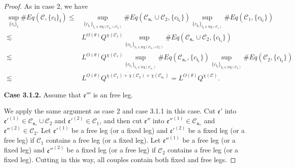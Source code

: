 \begin{proof}
As in case 2, we have
\begin{equation}
\begin{split}
    \sup_{\{c_{\mathfrak{l}}\}_{\mathfrak{l}}}\#Eq(\mathcal{C},\{c_{\mathfrak{l}}\}_{\mathfrak{l}})
    \le&
    \sup_{\{c_{\mathfrak{l}_1}\}_{\mathfrak{l}_1\in \text{leg}(\mathcal{C}_{\mathfrak{n}_*}\cup \mathcal{C}_2)} } \# Eq(\mathcal{C}_{\mathfrak{n}_*}\cup \mathcal{C}_2,\{c_{\mathfrak{l}_1}\}) \sup_{\{c_{\mathfrak{l}_2}\}_{\mathfrak{l}_2\in \text{leg}(\mathcal{C}_1)} }\# Eq(\mathcal{C}_{1}, \{c_{\mathfrak{l}_2}\})
    \\
    \lesssim&  L^{O(\theta)} Q^{\chi(\mathcal{C}_1)}\sup_{\{c_{\mathfrak{l}_1}\}_{\mathfrak{l}_1\in \text{leg}(\mathcal{C}_{\mathfrak{n}_*}\cup \mathcal{C}_2)} } \# Eq(\mathcal{C}_{\mathfrak{n}_*}\cup \mathcal{C}_2,\{c_{\mathfrak{l}_1}\})
    \\
    \lesssim&  L^{O(\theta)} Q^{\chi(\mathcal{C}_1)} \sup_{\{c_{\mathfrak{l}_1}\}_{\mathfrak{l}_1\in \text{leg}(\mathcal{C}_{\mathfrak{n}_*})} } \# Eq(\mathcal{C}_{\mathfrak{n}_*},\{c_{\mathfrak{l}_1}\}) \sup_{\{c_{\mathfrak{l}_2}\}_{\mathfrak{l}_2\in \text{leg}(\mathcal{C}_2)} }\# Eq(\mathcal{C}_{2}, \{c_{\mathfrak{l}_2}\})
    \\
    \lesssim&  L^{O(\theta)} Q^{\chi(\mathcal{C}_1)+\chi(\mathcal{C}_2)+\chi(\mathcal{C}_{\mathfrak{n}_*})}=L^{O(\theta)} Q^{\chi(\mathcal{C})}.
\end{split}
\end{equation}

\textbf{Case 3.1.2.} Assume that $\mathfrak{e}'''$ is an free leg. 

We apply the same argument as case 2 and case 3.1.1 in this case. Cut $\mathfrak{e}'$ into $\mathfrak{e}'^{(1)}\in  \mathcal{C}_{\mathfrak{n}_*}\cup \mathcal{C}_2$ and $\mathfrak{e}'^{(2)}\in  \mathcal{C}_1$, and then cut $\mathfrak{e}''$ into $\mathfrak{e}''^{(1)}\in  \mathcal{C}_{\mathfrak{n}_*}$ and $\mathfrak{e}''^{(2)}\in  \mathcal{C}_2$. Let $\mathfrak{e}'^{(1)}$ be a free leg (or a fixed leg) and $\mathfrak{e}'^{(2)}$ be a fixed leg (or a free leg) if $\mathcal{C}_1$ contains a free leg (or a fixed leg). Let $\mathfrak{e}''^{(1)}$ be a free leg (or a fixed leg) and $\mathfrak{e}''^{(2)}$ be a fixed leg (or a free leg) if $\mathcal{C}_2$ contains a free leg (or a fixed leg). Cutting in this way, all couples contain both fixed and free legs.


\end{proof}
